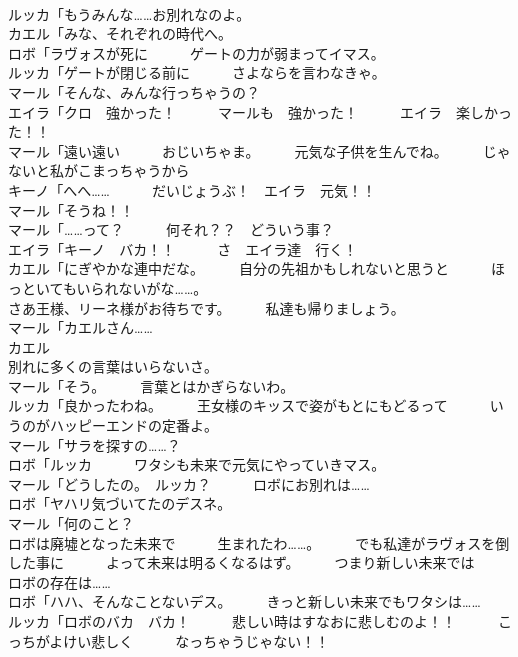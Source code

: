 \documentclass[8pt]{extreport}
\begin{document}
\begin{CJK}{UTF8}{min}
\\	ルッカ「もうみんな……お別れなのよ。	
\\	カエル「みな、それぞれの時代へ。	
\\	ロボ「ラヴォスが死に　　　ゲートの力が弱まってイマス。	
\\	ルッカ「ゲートが閉じる前に　　　さよならを言わなきゃ。	
\\	マール「そんな、みんな行っちゃうの？	
\\	エイラ「クロ　強かった！　　　マールも　強かった！　　　エイラ　楽しかった！！	
\\	マール「遠い遠い　　　おじいちゃま。　　　元気な子供を生んでね。　　　じゃないと私がこまっちゃうから	
\\	キーノ「へへ……　　　だいじょうぶ！　エイラ　元気！！	
\\	マール「そうね！！	
\\	マール「……って？　　　何それ？？　どういう事？	
\\	エイラ「キーノ　バカ！！　　　さ　エイラ達　行く！	
\\	カエル「にぎやかな連中だな。　　　自分の先祖かもしれないと思うと　　　ほっといてもいられないがな……。	
\\	さあ王様、リーネ様がお待ちです。　　　私達も帰りましょう。	
\\	マール「カエルさん……	
\\	カエル
\\	別れに多くの言葉はいらないさ。	
\\	マール「そう。　　　言葉とはかぎらないわ。	
\\	ルッカ「良かったわね。　　　王女様のキッスで姿がもとにもどるって　　　いうのがハッピーエンドの定番よ。	
\\	マール「サラを探すの……？	
\\	ロボ「ルッカ　　　ワタシも未来で元気にやっていきマス。	
\\	マール「どうしたの。　ルッカ？　　　ロボにお別れは……	
\\	ロボ「ヤハリ気づいてたのデスネ。	
\\	マール「何のこと？	
\\	ロボは廃墟となった未来で　　　生まれたわ……。　　　でも私達がラヴォスを倒した事に　　　よって未来は明るくなるはず。　　　つまり新しい未来では　　　ロボの存在は……	
\\	ロボ「ハハ、そんなことないデス。　　　きっと新しい未来でもワタシは……	
\\	ルッカ「ロボのバカ　バカ！　　　悲しい時はすなおに悲しむのよ！！　　　こっちがよけい悲しく　　　なっちゃうじゃない！！	

\end{CJK}
\end{document}
